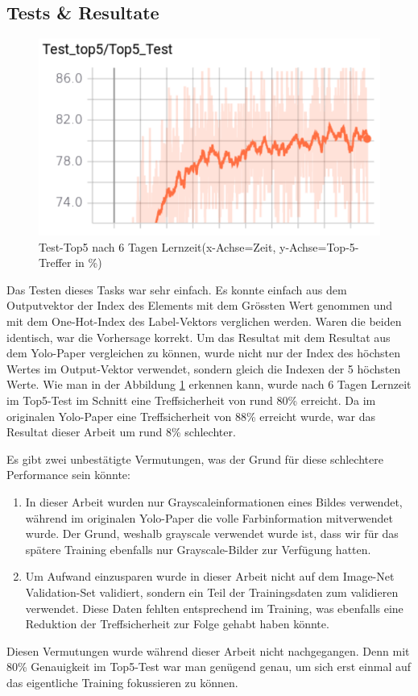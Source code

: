 \subsection{Tests \& Resultate}
\begin{figure}	
	\centering
	\includegraphics[width=.7\textwidth]{Kapitel/20Pretraining/Bilder/Test_top5.pdf}
	\caption{Test-Top5 nach 6 Tagen Lernzeit(x-Achse=Zeit, y-Achse=Top-5-Treffer in \%)}
	\label{img:test_top5}
\end{figure}   
Das Testen dieses Tasks war sehr einfach.
Es konnte einfach aus dem Outputvektor der Index des Elements mit dem Grössten Wert genommen und mit dem One-Hot-Index des Label-Vektors verglichen werden. 
Waren die beiden identisch, war die Vorhersage korrekt. 
Um das Resultat mit dem Resultat aus dem Yolo-Paper \cite{yolo} vergleichen zu können, wurde nicht nur der Index des höchsten Wertes im Output-Vektor verwendet, sondern gleich die Indexen der 5 höchsten Werte. 
Wie man in der Abbildung \ref{img:test_top5} erkennen kann, wurde nach 6 Tagen Lernzeit im Top5-Test im Schnitt eine Treffsicherheit von rund 80\% erreicht.
Da im originalen Yolo-Paper \cite{yolo} eine Treffsicherheit von 88\% erreicht wurde, war das Resultat dieser Arbeit um rund 8\% schlechter.

Es gibt zwei unbestätigte Vermutungen, was der Grund für diese schlechtere Performance sein könnte: 
\begin{enumerate}
\item In dieser Arbeit wurden nur Grayscaleinformationen eines Bildes verwendet, während im originalen Yolo-Paper \cite{yolo} die volle Farbinformation mitverwendet wurde. Der Grund, weshalb grayscale verwendet wurde ist, dass wir für das spätere Training ebenfalls nur Grayscale-Bilder zur Verfügung hatten.
\item Um Aufwand einzusparen wurde in dieser Arbeit nicht auf dem Image-Net Validation-Set validiert, sondern ein Teil der Trainingsdaten zum validieren verwendet. Diese Daten fehlten entsprechend im Training, was ebenfalls eine Reduktion der Treffsicherheit zur Folge gehabt haben könnte. 
\end{enumerate}
Diesen Vermutungen wurde während dieser Arbeit nicht nachgegangen.
Denn mit 80\% Genauigkeit im Top5-Test war man genügend genau, um sich erst einmal auf das eigentliche Training fokussieren zu können. 



